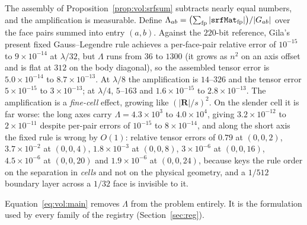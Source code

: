 The assembly of Proposition~\ref{prop:vol:srfsum} subtracts nearly equal numbers, and the
amplification is measurable. Define
$\Lambda_{ab} = \bigl(\sum_{\mathrm{fp}} |\texttt{srfMat}_{\mathrm{fp}}|\bigr) /
|G_{ab}|$ over the face pairs summed into entry $(a,b)$. Against the $220$-bit reference,
Gila's present fixed Gauss--Legendre rule achieves a per-face-pair relative error of
$10^{-15}$ to $9\times10^{-14}$ at $\lambda/32$, but $\Lambda$ runs from $36$ to $1300$
(it grows as $n^2$ on an axis offset and is flat at $312$ on the body diagonal), so the
assembled tensor error is $5.0\times10^{-14}$ to $8.7\times10^{-13}$. At $\lambda/8$ the
amplification is $14$--$326$ and the tensor error $5\times10^{-15}$ to
$3\times10^{-13}$; at $\lambda/4$, $5$--$163$ and $1.6\times10^{-15}$ to
$2.8\times10^{-13}$. The amplification is a \emph{fine-cell} effect, growing like
$(|\mathbf{R}|/s)^2$. On the slender cell it is far worse: the long axes carry
$\Lambda = 4.3\times10^{3}$ to $4.0\times10^{4}$, giving $3.2\times10^{-12}$ to
$2\times10^{-11}$ despite per-pair errors of $10^{-15}$ to $8\times10^{-14}$, and along
the short axis the fixed rule is wrong by $O(1)$: relative tensor errors of $0.79$ at
$(0,0,2)$, $3.7\times10^{-2}$ at $(0,0,4)$, $1.8\times10^{-3}$ at $(0,0,8)$,
$3\times10^{-6}$ at $(0,0,16)$, $4.5\times10^{-6}$ at $(0,0,20)$ and
$1.9\times10^{-6}$ at $(0,0,24)$, because  keys the rule order on the
separation in \emph{cells} and not on the physical geometry, and a $1/512$ boundary layer
across a $1/32$ face is invisible to it.

Equation~\eqref{eq:vol:main} removes $\Lambda$ from the problem entirely. It is the
formulation used by every family of the registry (Section~\ref{sec:reg}).
